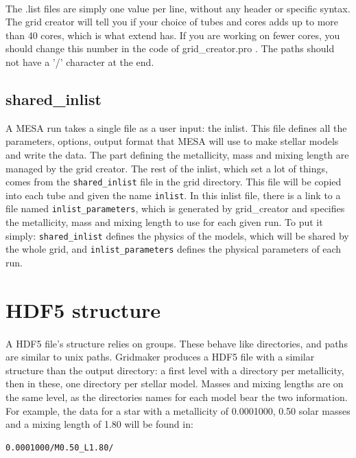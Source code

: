 \documentclass{report}
\begin{document}
\paragraph{} The .list files are simply one value per line, without any header or specific syntax. The grid creator will tell you if your choice of tubes
and cores adds up to more than 40 cores, which is what extend has. If you are working on fewer cores, you should change this number in the code of 
grid\_creator.pro . The paths should not have a '/' character at the end.


\subsection{shared\_inlist}

A MESA run takes a single file as a user input: the inlist. This file defines all the parameters, options, output format that MESA will use to make stellar models and write the data. The part defining the metallicity, mass and mixing length are managed by the grid creator. The rest of the inlist, which set a lot of things, comes from the \verb+shared_inlist+ file in the grid directory. This file will be copied into each tube and given the name \verb+inlist+. In this inlist file, there is a link to a file named \verb+inlist_parameters+, which is generated by grid\_creator and specifies the metallicity, mass and mixing length to use for each given run. To put it simply: \verb+shared_inlist+ defines the physics of the models, which will be shared by the whole grid, and \verb+inlist_parameters+ defines the physical parameters of each run.

\section{HDF5 structure}

\paragraph{}A HDF5 file's structure relies on groups. These behave like directories, and paths are similar to unix paths. Gridmaker produces a HDF5 file with a similar structure than the output directory: a first level with a directory per metallicity, then in these, one directory per stellar model. Masses and mixing lengths are on the same level, as the directories names for each model bear the two information. For example, the data for a star with a metallicity of 0.0001000, 0.50 solar masses and a mixing length of 1.80 will be found in:
\begin{verbatim}
0.0001000/M0.50_L1.80/
\end{verbatim}
\end{document}
